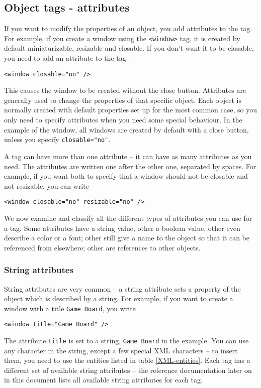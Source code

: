 \subsection{Object tags - attributes}
If you want to modify the properties of an object, you add attributes
to the tag.  For example, if you create a window using the
\texttt{<window>} tag, it is created by default miniaturizable, resizable and 
closable.  If you don't want it to be closable, you need to add an attribute
to the tag -
\begin{verbatim}
<window closable="no" />
\end{verbatim}
This causes the window to be created without the close button.
Attributes are generally used to change the properties of that
specific object.  Each object is normally created with default
properties set up for the most common case, so you only need to
specify attributes when you need some special behaviour.  In the
example of the window, all windows are created by default with a close
button, unless you specify \texttt{closable="no"}.

A tag can have more than one attribute -- it can have as many
attributes as you need.  The attributes are written one after the
other one, separated by spaces.  For example, if you want both to specify
that a window should not be closable and not resizable, you can write
\begin{verbatim}
<window closable="no" resizable="no" />
\end{verbatim}

We now examine and classify all the different types of attributes you
can use for a tag.  Some attributes have a string value, other a
boolean value, other even describe a color or a font; other still give
a name to the object so that it can be referenced from elsewhere;
other are references to other objects.

\subsubsection{String attributes}
String attributes are very common -- a string attribute sets a
property of the object which is described by a string.  For example,
if you want to create a window with a title \texttt{Game Board}, you
write
\begin{verbatim}
<window title="Game Board" />
\end{verbatim}
The attribute \texttt{title} is set to a string, \texttt{Game Board}
in the example.  You can use any character in the string, except a few
special XML characters -- to insert them, you need to use the entities
listed in table \ref{XML-entities}.  Each tag has a different set of
available string attributes -- the reference documentation later on in
this document lists all available string attributes for each tag.

